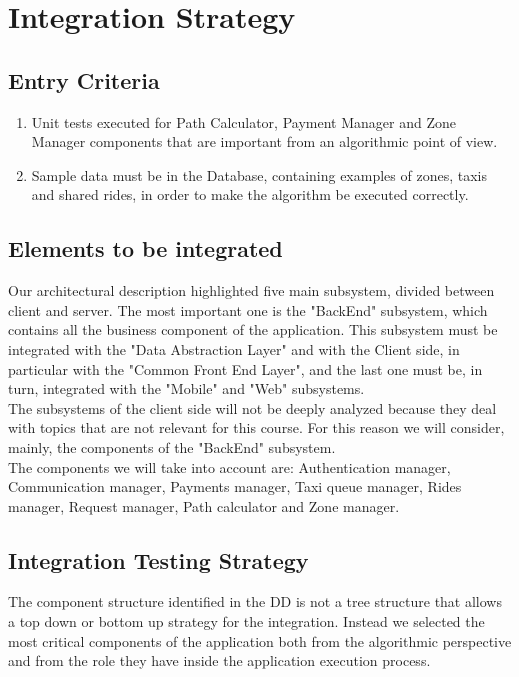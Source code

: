 \section{Integration Strategy}

\subsection{Entry Criteria}
\begin{enumerate}
    \item Unit tests executed for Path Calculator, Payment Manager and Zone Manager components that are important from an algorithmic point of view.
    \item Sample data must be in the Database, containing examples of zones, taxis and shared rides, in order to make the algorithm be executed correctly.
\end{enumerate}

\subsection{Elements to be integrated}
Our architectural description highlighted five main subsystem, divided between client and server. The most important one is the "BackEnd" subsystem, which contains all the business component of the application. This subsystem must be integrated with the "Data Abstraction Layer" and with the Client side, in particular with the "Common Front End Layer", and the last one must be, in turn, integrated with the "Mobile" and "Web" subsystems.\\
The subsystems of the client side will not be deeply analyzed because they deal with topics that are not relevant for this course. For this reason we will consider, mainly, the components of the "BackEnd" subsystem.\\
The components we will take into account are: Authentication manager, Communication manager, Payments manager, Taxi queue manager, Rides manager, Request manager, Path calculator and Zone manager.

\subsection{Integration Testing Strategy}

The component structure identified in the DD is not a tree structure that allows a top down or bottom up strategy for the integration. Instead we selected the most critical components of the application both from the algorithmic perspective and from the role they have inside the application execution process.\\

